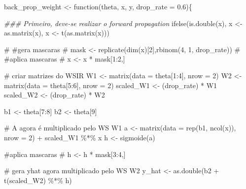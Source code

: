 \documentclass[
  a4paperpaper,
]{article}
\newenvironment{Shaded}{\begin{snugshade}}{\end{snugshade}}
\newcommand{\AttributeTok}[1]{\textcolor[rgb]{0.40,0.45,0.13}{#1}}
\newcommand{\CommentTok}[1]{\textcolor[rgb]{0.37,0.37,0.37}{#1}}
\newcommand{\ControlFlowTok}[1]{\textcolor[rgb]{0.00,0.23,0.31}{#1}}
\newcommand{\DecValTok}[1]{\textcolor[rgb]{0.68,0.00,0.00}{#1}}
\newcommand{\DocumentationTok}[1]{\textcolor[rgb]{0.37,0.37,0.37}{\textit{#1}}}
\newcommand{\FloatTok}[1]{\textcolor[rgb]{0.68,0.00,0.00}{#1}}
\newcommand{\FunctionTok}[1]{\textcolor[rgb]{0.28,0.35,0.67}{#1}}
\newcommand{\NormalTok}[1]{\textcolor[rgb]{0.00,0.23,0.31}{#1}}
\newcommand{\OtherTok}[1]{\textcolor[rgb]{0.00,0.23,0.31}{#1}}
\newcommand{\SpecialCharTok}[1]{\textcolor[rgb]{0.37,0.37,0.37}{#1}}
\begin{document}
\begin{Shaded}
\begin{Highlighting}[]
\NormalTok{back\_prop\_weight }\OtherTok{\textless{}{-}} \ControlFlowTok{function}\NormalTok{(theta, x, y, }\AttributeTok{drop\_rate =} \FloatTok{0.6}\NormalTok{)\{}

  \DocumentationTok{\#\#\# Primeiro, deve{-}se realizar o forward propagation}
  \FunctionTok{ifelse}\NormalTok{(}\FunctionTok{is.double}\NormalTok{(x), x }\OtherTok{\textless{}{-}} \FunctionTok{as.matrix}\NormalTok{(x), x }\OtherTok{\textless{}{-}} \FunctionTok{t}\NormalTok{(}\FunctionTok{as.matrix}\NormalTok{(x)))}
  
    \CommentTok{\# \#gera mascaras}
    \CommentTok{\# mask \textless{}{-} replicate(dim(x)[2],rbinom(4, 1, drop\_rate))}
    \CommentTok{\# \#aplica mascaras}
    \CommentTok{\# x \textless{}{-} x * mask[1:2,]}
  
  \CommentTok{\# criar matrizes do WSIR}
\NormalTok{  W1 }\OtherTok{\textless{}{-}} \FunctionTok{matrix}\NormalTok{(}\AttributeTok{data =}\NormalTok{ theta[}\DecValTok{1}\SpecialCharTok{:}\DecValTok{4}\NormalTok{], }\AttributeTok{nrow =} \DecValTok{2}\NormalTok{)}
\NormalTok{  W2 }\OtherTok{\textless{}{-}} \FunctionTok{matrix}\NormalTok{(}\AttributeTok{data =}\NormalTok{ theta[}\DecValTok{5}\SpecialCharTok{:}\DecValTok{6}\NormalTok{], }\AttributeTok{nrow =} \DecValTok{2}\NormalTok{)}
\NormalTok{  scaled\_W1 }\OtherTok{\textless{}{-}}\NormalTok{ (drop\_rate) }\SpecialCharTok{*}\NormalTok{ W1}
\NormalTok{  scaled\_W2 }\OtherTok{\textless{}{-}}\NormalTok{ (drop\_rate) }\SpecialCharTok{*}\NormalTok{ W2}
  
\NormalTok{  b1 }\OtherTok{\textless{}{-}}\NormalTok{ theta[}\DecValTok{7}\SpecialCharTok{:}\DecValTok{8}\NormalTok{]}
\NormalTok{  b2 }\OtherTok{\textless{}{-}}\NormalTok{ theta[}\DecValTok{9}\NormalTok{]}
  
  \CommentTok{\# A agora é multiplicado pelo WS W1}
\NormalTok{  a }\OtherTok{\textless{}{-}} \FunctionTok{matrix}\NormalTok{(}\AttributeTok{data =} \FunctionTok{rep}\NormalTok{(b1, }\FunctionTok{ncol}\NormalTok{(x)), }\AttributeTok{nrow =} \DecValTok{2}\NormalTok{) }\SpecialCharTok{+}\NormalTok{ scaled\_W1 }\SpecialCharTok{\%*\%}\NormalTok{ x}
\NormalTok{  h }\OtherTok{\textless{}{-}} \FunctionTok{sigmoide}\NormalTok{(a)}
    
  \CommentTok{\#aplica mascaras}
    \CommentTok{\# h \textless{}{-} h * mask[3:4,]}
  
  \CommentTok{\# gera yhat agora multiplicado pelo WS W2}
\NormalTok{  y\_hat }\OtherTok{\textless{}{-}} \FunctionTok{as.double}\NormalTok{(b2 }\SpecialCharTok{+} \FunctionTok{t}\NormalTok{(scaled\_W2) }\SpecialCharTok{\%*\%}\NormalTok{ h)}
  

\end{Highlighting}
\end{Shaded}
\end{document}
